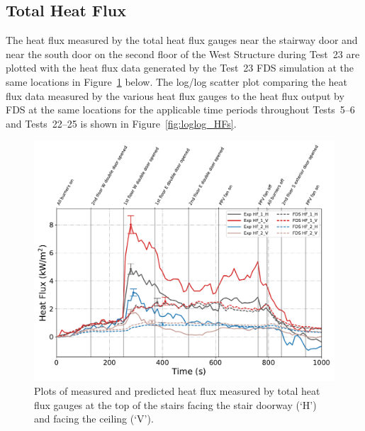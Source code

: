 \clearpage
\subsection{Total Heat Flux}
The heat flux measured by the total heat flux gauges near the stairway door and near the south door on the second floor of the West Structure during Test~23 are plotted with the heat flux data generated by the Test~23 FDS simulation at the same locations in Figure~\ref{fig:Test23_HFs} below. The log/log scatter plot comparing the heat flux data measured by the various heat flux gauges to the heat flux output by FDS at the same locations for the applicable time periods throughout Tests~5--6 and Tests~22--25 is shown in Figure~\ref{fig:loglog_HFs}.  

\begin{figure}[!h]
	\centering
	\includegraphics[width=\columnwidth]{Figures/Plots/Validation/Heat_Flux/Test_23_HFs}
	\caption[Plots of measured and predicted heat flux during Test~23.]{Plots of measured and predicted heat flux measured by total heat flux gauges at the top of the stairs facing the stair doorway (`H') and facing the ceiling (`V').}
	\label{fig:Test23_HFs}
\end{figure}

